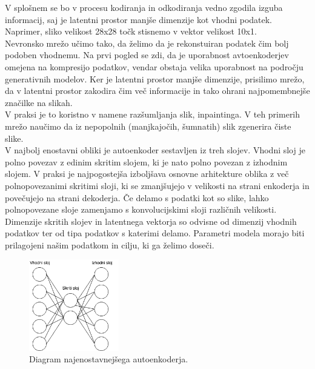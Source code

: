 \documentclass[12pt,a4paper,twoside]{article}
\theoremstyle{definition} %
\theoremstyle{plain} %
\numberwithin{equation}{section}  %
\begin{document}
V splošnem se bo v procesu kodiranja in odkodiranja vedno zgodila izguba informacij, saj je latentni prostor manjše dimenzije kot vhodni podatek. Naprimer, sliko velikost 28x28 točk stisnemo v vektor velikost 10x1. 
\\
Nevronsko mrežo učimo tako, da želimo da je rekonstuiran podatek čim bolj podoben vhodnemu. Na prvi pogled se zdi, da je uporabnost avtoenkoderjev omejena na kompresijo podatkov, vendar obstaja velika uporabnost na področju generativnih modelov. 
Ker je latentni prostor manjše dimenzije, prisilimo mrežo, da v latentni prostor zakodira čim več informacije in tako ohrani najpomembnejše značilke na slikah. \\
V praksi je to koristno v namene razšumljanja slik, inpaintinga. V teh primerih mrežo naučimo da iz nepopolnih (manjkajočih, šumnatih) slik zgenerira čiste slike. 
\\
V najbolj enostavni obliki je autoenkoder sestavljen iz treh slojev. Vhodni sloj je polno povezav z edinim skritim slojem, ki je nato polno povezan z izhodnim slojem. 
V praksi je najpogostejša izboljšava osnovne arhitekture  oblika z več polnopovezanimi skritimi sloji, ki se zmanjšujejo v velikosti na strani enkoderja in povečujejo na strani dekoderja. 
Če delamo s podatki kot so slike, lahko polnopovezane sloje zamenjamo s konvolucijskimi sloji različnih velikosti. 
\\
Dimenzije skritih slojev in latentnega vektorja so odvisne od dimenzij vhodnih podatkov ter od tipa podatkov s katerimi delamo. Parametri modela morajo biti prilagojeni našim podatkom in cilju, ki ga želimo doseči. 

\begin{figure}[ht]
  \centering
  \includegraphics[width=0.35\textwidth]{images/autoencoder.png}
 \caption[Diagram najenostavnejšega autoenkoderja]{Diagram najenostavnejšega autoenkoderja.}
  \label{fig:autoencoder-diagram}
\end{figure}
\end{document}
